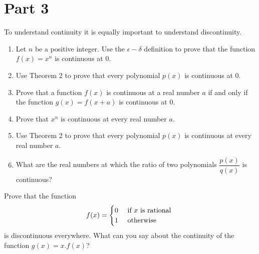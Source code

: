 \documentclass[9pt, a4paper, oneside]{amsart}
\begin{document}
\newpage\section*{Part 3}

To understand continuity it is equally important to understand discontinuity.
\begin{questions}[resume]
	\item
	\begin{enumerate}
		\item Let $ n$ be a positive integer. Use the $ \epsilon-\delta$ definition to prove that the function $f(x)=x^n$ is continuous at 0.

		\item Use Theorem 2 to prove that every polynomial $p(x)$ is continuous at 0.

		\item Prove that a function $ f(x)$ is continuous at a real number $a$ if and only if the function $ g(x) = f(x + a)$ is continuous at $0$.

		\item Prove that $x^n$ is continuous at every real number $ a $.

		\item Use Theorem 2 to prove that every polynomial $p(x)$ is continuous at every real number $ a $.

		\item What are the real numbers at which the ratio of two polynomials $\dfrac{p(x)}{q(x)}$ is continuous?
	\end{enumerate}


	\item Prove that the function
	$$ f(x) = \begin{cases} 0 & \mbox{ if $ x$ is rational } \\ 1 & \mbox{ otherwise }\end{cases}$$
	is discontinuous everywhere. What can you say about the continuity of the function $ g(x) = x .f(x)$?
\end{questions}
\end{document}

